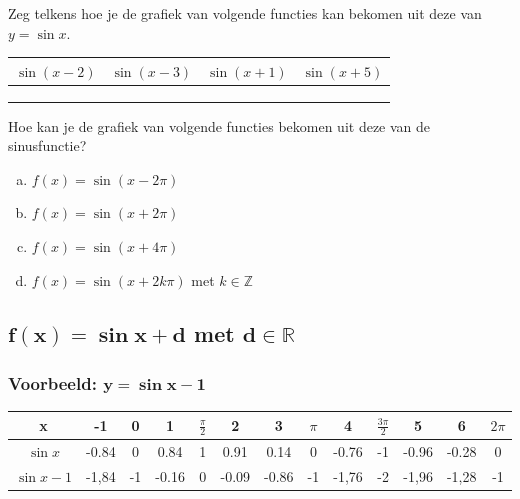 \documentclass[a4paper,12pt,twoside ]{article}
\begin{document}
\begin{oefening}
Zeg telkens hoe je de grafiek van volgende functies kan bekomen uit deze van $y=\sin x$.
\begin{center}
  \begin{tabular}{c|c|c|c}
    $\sin (x-2)$ & $\sin (x-3)$ & $\sin (x+1)$ & $\sin (x+5)$\\
    \hline
    \hspace*{3cm} &\hspace*{3cm}&\hspace*{3cm}&\hspace*{3cm}
    \\
    &&&
    \\
    &&&
  \end{tabular}
\end{center}
\end{oefening}

\begin{oefening}
Hoe kan je de grafiek van volgende functies bekomen uit deze van de sinusfunctie?
\begin{enumerate}[(a)]
  \item $f(x)=\sin(x-2\pi)$
  \item $f(x)=\sin(x+2\pi)$
  \item $f(x)=\sin(x+4\pi)$
  \item $f(x)=\sin(x+2k\pi)$ met $k\in\mathbb{Z}$
\end{enumerate}
\end{oefening}

\subsection{$\boldsymbol{f(x)=\sin x + d}$ met $\boldsymbol{d\in \mathbb{R}}$}
\subsubsection{Voorbeeld: $\boldsymbol{y=\sin x-1}$}
\begin{adjustwidth}{-2.5cm}{-2.5cm}
\begin{center}
\scriptsize
  \begin{tabular}{c|c|c|c|c|c|c|c|c|c|c|c|c}
    x & -1 & 0 & 1 &  $\frac{\pi}{2}$ & 2 & 3 & $\pi$ & 4 & $\frac{3\pi}{2}$ & 5 & 6 & $2\pi$
    \\
    \hline
   $\sin x$ &-0.84&0&0.84&1&0.91&0.14&0&-0.76&-1&-0.96&-0.28 &0
    \\
    \hline
   $\sin x-1$ &-1,84& -1& -0.16& 0& -0.09& -0.86& -1& -1,76& -2& -1,96& -1,28 &-1
  \end{tabular}
\end{center}
\end{adjustwidth}
\end{document}
